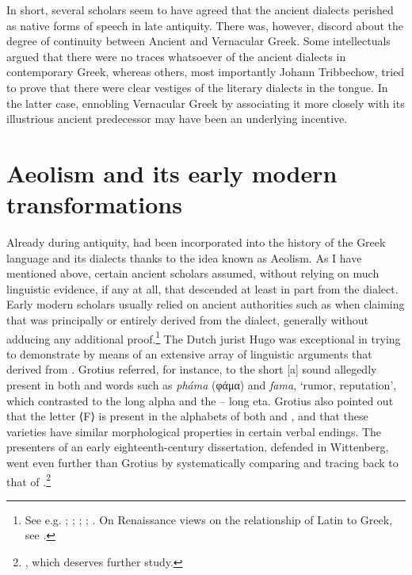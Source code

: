 In short, several scholars seem to have agreed that the ancient dialects perished as native forms of speech in late antiquity. There was, however, discord about the degree of continuity between Ancient and Vernacular Greek. Some intellectuals argued that there were no traces whatsoever of the ancient dialects in contemporary Greek, whereas others, most importantly Johann Tribbechow, tried to prove that there were clear vestiges of the literary dialects in the  tongue. In the latter case, ennobling Vernacular Greek by associating it more closely with its illustrious ancient predecessor may have been an underlying incentive.

\section{Aeolism and its early modern transformations}\label{sec:5.6}

Already during antiquity,  had been incorporated into the history of the Greek language and its dialects thanks to the idea known as Aeolism. As I have mentioned above, certain ancient scholars assumed, without relying on much linguistic evidence, if any at all, that  descended at least in part from the  dialect. Early modern scholars usually relied on ancient authorities such as  when claiming that  was principally or entirely derived from the  dialect, generally without adducing any additional proof.\footnote{See e.g. \citet[84]{Crinesius1629}; \citet[\textsc{xvii}]{Bentley1726}; \citet[76, 106]{Hemsterhuis2015}; \citet[30]{Munthe1748}; \citet[215--216]{Simonis1752}. On Renaissance views on the relationship of Latin to Greek, see \citet{Tavoni1986}.} The Dutch jurist Hugo \citet[144--146]{Grotius1648} was exceptional in trying to demonstrate by means of an extensive array of linguistic arguments that  derived from . Grotius referred, for instance, to the short [a] sound allegedly present in both  and  words such as \textit{pháma} (φάμα) and \textit{fama}, ‘rumor, reputation’, which contrasted to the  long alpha and the – long eta. Grotius also pointed out that the letter  ⟨F⟩ is present in the alphabets of both  and , and that these varieties have similar morphological properties in certain verbal endings. The presenters of an early eighteenth-century dissertation, defended in Wittenberg, went even further than Grotius by systematically comparing and tracing back   to that of .\footnote{\citet{ThryllitschBrunner1709}, which deserves further study.}

